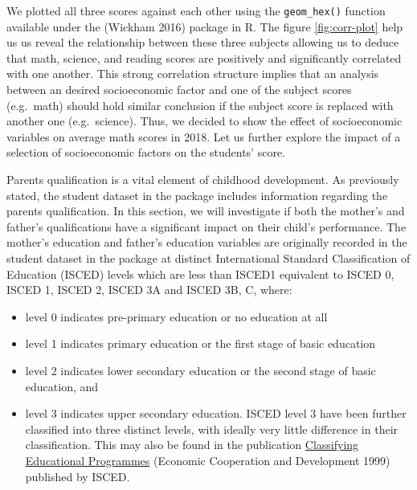 We plotted all three scores against each other using the \texttt{geom\_hex()} function available under the  (Wickham 2016) package in R. The figure \ref{fig:corr-plot} help us us reveal the relationship between these three subjects allowing us to deduce that math, science, and reading scores are positively and significantly correlated with one another. This strong correlation structure implies that an analysis between an desired socioeconomic factor and one of the subject scores (e.g.~math) should hold similar conclusion if the subject score is replaced with another one (e.g.~science). Thus, we decided to show the effect of socioeconomic variables on average math scores in 2018. Let us further explore the impact of a selection of socioeconomic factors on the students' score.

Parents qualification is a vital element of childhood development. As previously stated, the student dataset in the package includes information regarding the parents qualification. In this section, we will investigate if both the mother's and father's qualifications have a significant impact on their child's performance. The mother's education and father's education variables are originally recorded in the student dataset in the  package at distinct International Standard Classification of Education (ISCED) levels which are less than ISCED1 equivalent to ISCED 0, ISCED 1, ISCED 2, ISCED 3A and ISCED 3B, C, where:

\begin{itemize}
\tightlist
\item
  level 0 indicates pre-primary education or no education at all
\item
  level 1 indicates primary education or the first stage of basic education
\item
  level 2 indicates lower secondary education or the second stage of basic education, and
\item
  level 3 indicates upper secondary education. ISCED level 3 have been further classified into three distinct levels, with ideally very little difference in their classification. This may also be found in the publication \href{https://www.oecd.org/education/1841854.pdf}{Classifying Educational Programmes} (Economic Cooperation and Development 1999) published by ISCED.
\end{itemize}

